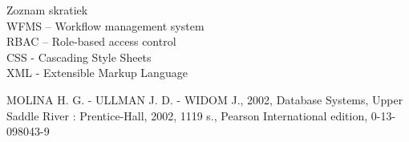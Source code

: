 \documentclass[12pt, oneside]{book}
\begin{document}


\newpage 

{\LARGE Zoznam skratiek}\\

\noindent
WFMS – Workflow management system\\
RBAC – Role-based access control\\
CSS - Cascading Style Sheets\\
XML - Extensible Markup Language\\



\listoffigures




\mainmatter


 









\newpage

\backmatter

\thispagestyle{empty}
\nocite{*}
\clearpage



 

\begin{thebibliography}{5}
 
 MOLINA H. G. - ULLMAN J. D. - WIDOM J., 2002, Database Systems, Upper Saddle River : Prentice-Hall, 2002, 1119 s., Pearson International edition, 0-13-098043-9


\end{thebibliography}



%
%
%
%
\end{document}
